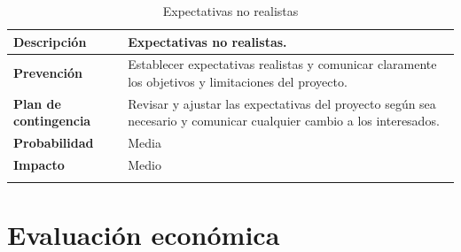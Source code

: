 \documentclass{report}
\begin{document}
        \begin{center}
            \begin{longtable}{|p{6cm}|p{6cm}|}
                \hline
                \textbf{Descripción} & Expectativas no realistas.\\
                \hline
                \textbf{Prevención} & Establecer expectativas realistas y comunicar claramente los objetivos y limitaciones del proyecto.\\
                \hline
                \textbf{Plan de contingencia} & Revisar y ajustar las expectativas del proyecto según sea necesario y comunicar cualquier cambio a los interesados.\\
                \hline
                \textbf{Probabilidad} & Media\\
                \hline
                \textbf{Impacto} & Medio\\
                \hline
                \caption{Expectativas no realistas}
            \end{longtable}
        \end{center}
    \chapter{Evaluación económica}
\end{document}
